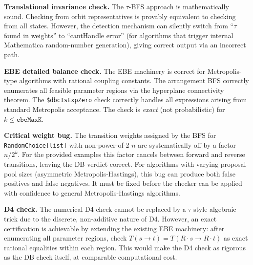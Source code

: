 \documentclass[12pt,a4paper]{article}
\theoremstyle{critical}
\theoremstyle{remark}
\begin{document}
\textbf{Translational invariance check.} The $\tau$-BFS approach is mathematically
sound. Checking from orbit representatives is provably equivalent to checking from all
states. However, the detection mechanism can silently switch from ``$\tau$ found in
weights'' to ``cantHandle error'' (for algorithms that trigger internal Mathematica
random-number generation), giving correct output via an incorrect path.

\textbf{EBE detailed balance check.} The EBE machinery is correct for Metropolis-type
algorithms with rational coupling constants. The arrangement BFS correctly enumerates all
feasible parameter regions via the hyperplane connectivity theorem. The \texttt{\$dbcIsExpZero}
check correctly handles all expressions arising from standard Metropolis acceptance. The
check is \emph{exact} (not probabilistic) for $k \leq \texttt{ebeMaxK}$.

\textbf{Critical weight bug.} The transition weights assigned by the BFS for
\texttt{RandomChoice[list]} with non-power-of-2 $n$ are systematically off by a factor
$n/2^k$. For the provided examples this factor cancels between forward and reverse
transitions, leaving the DB verdict correct. For algorithms with varying proposal-pool
sizes (asymmetric Metropolis-Hastings), this bug can produce both false positives and
false negatives. It must be fixed before the checker can be applied with confidence to
general Metropolis-Hastings algorithms.

\textbf{D4 check.} The numerical D4 check cannot be replaced by a $\tau$-style algebraic
trick due to the discrete, non-additive nature of D4. However, an exact certification is
achievable by extending the existing EBE machinery: after enumerating all parameter
regions, check $T(s\to t) = T(R\cdot s\to R\cdot t)$ as exact rational equalities within
each region. This would make the D4 check as rigorous as the DB check itself, at
comparable computational cost.
\end{document}
